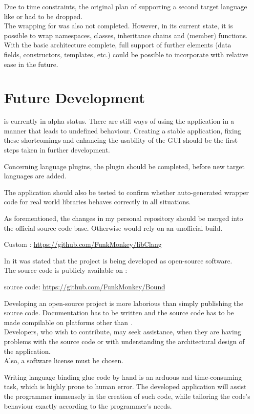Due to time constraints, the original plan of supporting a second target language like  or  had to be dropped.\\ The wrapping for  was also not completed. However, in its current state, it is possible to wrap namespaces, classes, inheritance chains and (member) functions.\\
With the basic architecture complete, full support of
further elements (data fields, constructors, templates, etc.) could be possible to incorporate with relative ease in the future.

\chapter{Future Development}
\label{chap:FutureDevelopment}

 is currently in alpha status. There are still ways of using the application in a manner that leads to undefined behaviour. Creating a stable application, fixing these shortcomings and enhancing the usability of the GUI should be the first steps taken in further development.

Concerning language plugins, the  plugin should be completed, before new target languages are added.

The application should also be tested to confirm whether auto-generated wrapper code for real world libraries behaves correctly in all situations.

As forementioned, the changes in my personal  repository should be merged into the official source code base. Otherwise  would rely on an unofficial  build.

\hspace{20pt} Custom : \url{https://github.com/FunkMonkey/libClang}

In  it was stated that the project is being developed as open-source software.\\
The source code is publicly available on :

\hspace{20pt}  source code: \url{https://github.com/FunkMonkey/Bound}

Developing an open-source project is more laborious than simply publishing the source code. Documentation has to be written and the source code has to be made compilable on platforms other than .\\
Developers, who wish to contribute, may seek assistance, when they are having problems with the source code or with understanding the architectural design of the application.\\
Also, a software license must be chosen.

Writing language binding glue code by hand is an arduous and time-consuming task, which is highly prone to human error. The developed application will assist the \linebreak programmer immensely in the creation of such code, while tailoring the code's behaviour exactly according to the programmer's needs.